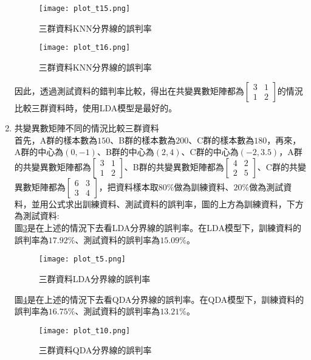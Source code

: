 \documentclass[12pt, a4paper]{article}
\begin{document}
\begin{enumerate}
\begin{figure}[h]
\centering
\texttt{[image: plot\_t15.png]}
\caption{三群資料KNN分界線的誤判率}
\label{fig:plot_t15.png}
\end{figure}

\begin{figure}[H]
\centering
\texttt{[image: plot\_t16.png]}
\caption{三群資料KNN分界線的誤判率}
\label{fig:plot_t16.png}
\end{figure}

因此，透過測試資料的錯判率比較，得出在共變異數矩陣都為\;$\begin{bmatrix}3 & 1 \\1 & 2 \end{bmatrix}$\;的情況比較三群資料時，使用LDA模型是最好的。
  
  
  
  

\item 共變異數矩陣不同的情況比較三群資料\\
首先，A群的樣本數為\;$150$\;、B群的樣本數為\;$200$\;、C群的樣本數為\;$180$\;，再來，A群的中心為\;$(0, -1)$\;、B群的中心為\;$(2,4)$\;、C群的中心為\;$(-2,3.5)$\;，A群的共變異數矩陣都為\;$\begin{bmatrix}3 & 1 \\1 & 2 \end{bmatrix}$\;、B群的共變異數矩陣都為\;$\begin{bmatrix}4 & 2 \\2 & 5 \end{bmatrix}$\;、C群的共變異數矩陣都為\;$\begin{bmatrix}6 & 3 \\3 & 4 \end{bmatrix}$\;，把資料樣本取\;$80\%$\;做為訓練資料、\;$20\%$\;做為測試資料，並用公式求出訓練資料、測試資料的誤判率，圖的上方為訓練資料，下方為測試資料\;:\\
圖\;\ref{fig:plot_t5.png}\;是在上述的情況下去看\;LDA\;分界線的誤判率。在LDA模型下，訓練資料的誤判率為\;$17.92\%$\;、測試資料的誤判率為\;$15.09\%$\;。

\begin{figure}[H]
\centering
\texttt{[image: plot\_t5.png]}
\caption{三群資料LDA分界線的誤判率}
\label{fig:plot_t5.png}
\end{figure}

圖\;\ref{fig:plot_t10.png}\;是在上述的情況下去看\;QDA\;分界線的誤判率。在QDA模型下，訓練資料的誤判率為\;$16.75\%$\;、測試資料的誤判率為\;$13.21\%$\;。
\begin{figure}[H]
\centering
\texttt{[image: plot\_t10.png]}
\caption{三群資料QDA分界線的誤判率}
\label{fig:plot_t10.png}
\end{figure}


\end{enumerate}
\end{document}
